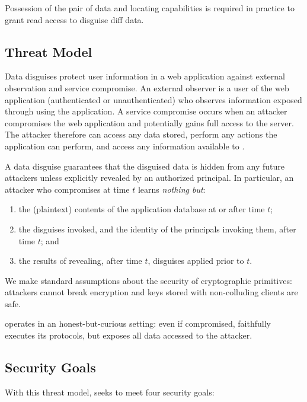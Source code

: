 \noindent Possession of the pair of data and locating capabilities  is required in
practice to grant read access to disguise diff data.

\subsection{Threat Model}
\label{s:threat}

%
Data disguises protect user information in a web application against external observation
and service compromise.
%
An external observer is a user of the web application (authenticated or unauthenticated) who
observes information exposed through using the application.
%
A service compromise occurs when an attacker compromises the web application and potentially
gains full access to the server.
%
The attacker therefore can access any data stored, perform any actions the application can
perform, and access any information available to \sys.
%

%
A data disguise guarantees that the disguised data is hidden from any future attackers unless
explicitly revealed by an authorized principal.
%
In particular, an attacker who compromises \sys at time $t$ learns \emph{nothing but}:
\begin{enumerate}[nosep]
  \item the (plaintext) contents of the application database at or after time $t$;
  \item the disguises invoked, and the identity of the principals invoking them, after time $t$; and
  \item the results of revealing, after time $t$, disguises applied prior to $t$.
\end{enumerate}
%
We make standard assumptions about the security of cryptographic primitives: attackers cannot
break encryption and keys stored with non-colluding clients are safe.
%

%
\sys operates in an honest-but-curious setting: even if compromised, \sys faithfully executes
its protocols, but exposes all data accessed to the attacker.
%

\subsection{Security Goals}
%
With this threat model, \sys seeks to meet four security goals:
%

